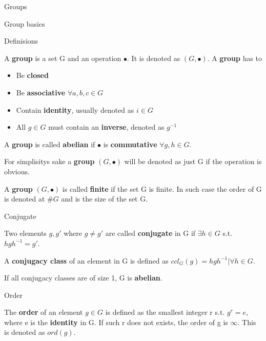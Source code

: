 \documentclass[12pt, letterpaper]{article}
\begin{document}
\begin{section}{Groups}

  \begin{subsection}{Group basics}

    \begin{subsubsection}{Definisions}

      A \textbf{group} is a set G and an operation \(\bullet\). It is denoted as
      \((G, \bullet)\). A \textbf{group} has to
      \begin{itemize}
        \item Be \textbf{closed}
        \item Be \textbf{associative} \(\forall a,b,c \in G\)
        \item Contain \textbf{identity}, usually denoted as \(i \in G\)
        \item All \(g \in G\) must contain an \textbf{inverse}, denoted as \(g^{-1}\)
      \end{itemize}
      A \textbf{group} is called \textbf{abelian} if \(\bullet\) is \textbf{commutative}
      \(\forall g, h \in G\).

      For simplisitys sake a \textbf{group} \((G, \bullet)\) will be denoted as just G
      if the operation is obvious.

      A \textbf{group} \((G, \bullet)\) is called \textbf{finite} if the set G is finite.
      In such case the order of G is denoted at \(\#G\) and is the size of the set G.

    \end{subsubsection}

    \begin{subsubsection}{Conjugate}

      Two elements \(g, g'\) where \(g \neq g'\) are called \textbf{conjugate} in G
      if \(\exists h \in G \) s.t. \(hgh^{-1} = g'\).

      A \textbf{conjugacy class} of an element in G is defined as
      \(ccl_{G}(g) = {hgh^{-1} | \forall h \in G}\).

      If all conjugacy classes are of size 1, G is \textbf{abelian}.

    \end{subsubsection}

    \begin{subsubsection}{Order}

      The \textbf{order} of an element \(g \in G\) is defined as the smallest
      integer r s.t. \(g^{r} = e\), where e is the \textbf{identity} in G.
      If such r does not exists, the order of g is \(\infty\).
      This is denoted as \(ord(g)\).


\end{subsubsection}
\end{subsection}
\end{section}
\end{document}
